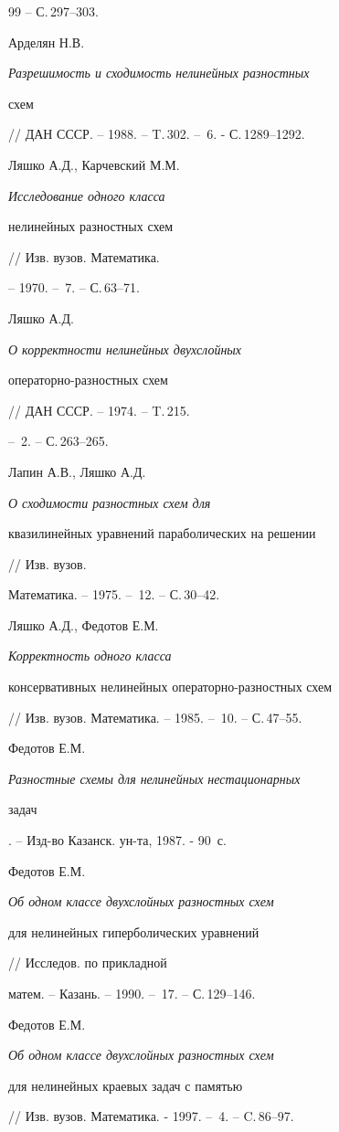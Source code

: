 {\begin{thebibliography}{99}
-- С.\,297--303.




Арделян Н.В. {\em Разрешимость и сходимость нелинейных разностных 


схем} // ДАН СССР. -- 1988. -- T.\,302. -- \No\,6. - С.\,1289--1292.




Ляшко А.Д.,  Карчевский М.М. {\em Исследование одного класса 


нелинейных разностных  схем} // Изв. вузов. Математика.


-- 1970. -- \No\,7. -- С.\,63--71.




Ляшко А.Д. {\em О корректности нелинейных двухслойных 


операторно-разностных схем} // ДАН СССР. -- 1974. -- T.\,215.


-- \No\,2. -- С.\,263--265.




Лапин А.В., Ляшко А.Д. {\em О сходимости разностных схем для 


квазилинейных уравнений параболических на решении} // Изв. вузов. 


Математика. -- 1975. -- \No\,12. -- С.\,30--42.




Ляшко А.Д., Федотов Е.М. {\em Корректность одного класса 


консервативных нелинейных операторно-разностных  схем}


// Изв. вузов. Математика. -- 1985. -- \No\,10. -- С.\,47--55.




Федотов Е.М. {\em Разностные схемы для нелинейных нестационарных 


задач}. -- Изд-во Казанск. ун-та, 1987. - 90~с.




Федотов Е.М. {\em Об одном классе двухслойных разностных схем 


для нелинейных гиперболических уравнений} // Исследов. по прикладной 


матем. -- Казань. -- 1990. -- \No\,17. -- С.\,129--146.




Федотов Е.М. {\em Об одном классе двухслойных разностных схем


для нелинейных краевых задач с памятью}


//  Изв. вузов. Математика. - 1997. -- \No\,4. -- C.\,86--97.



\end{thebibliography}}
